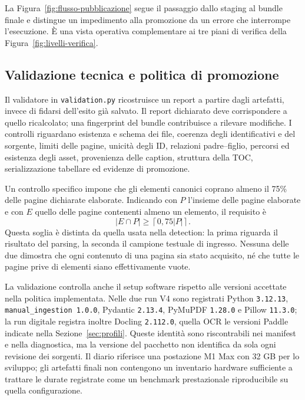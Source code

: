 La Figura~\ref{fig:flusso-pubblicazione} segue il passaggio dallo staging al bundle finale e distingue un impedimento alla promozione da un errore che interrompe l'esecuzione. È una vista operativa complementare ai tre piani di verifica della Figura~\ref{fig:livelli-verifica}.



\subsection{Validazione tecnica e politica di promozione}

Il validatore in \texttt{validation.py} ricostruisce un report a partire dagli artefatti, invece di fidarsi dell'esito già salvato. Il report dichiarato deve corrispondere a quello ricalcolato; una fingerprint del bundle contribuisce a rilevare modifiche. I controlli riguardano esistenza e schema dei file, coerenza degli identificativi e del sorgente, limiti delle pagine, unicità degli ID, relazioni padre--figlio, percorsi ed esistenza degli asset, provenienza delle caption, struttura della TOC, serializzazione tabellare ed evidenze di promozione.

Un controllo specifico impone che gli elementi canonici coprano almeno il 75\% delle pagine dichiarate elaborate. Indicando con $P$ l'insieme delle pagine elaborate e con $E$ quello delle pagine contenenti almeno un elemento, il requisito è
\begin{equation}
    |E\cap P|\geq\left\lceil0{,}75|P|\right\rceil.
\end{equation}
Questa soglia è distinta da quella usata nella detection: la prima riguarda il risultato del parsing, la seconda il campione testuale di ingresso. Nessuna delle due dimostra che ogni contenuto di una pagina sia stato acquisito, né che tutte le pagine prive di elementi siano effettivamente vuote.

La validazione controlla anche il setup software rispetto alle versioni accettate nella politica implementata. Nelle due run V4 sono registrati Python \texttt{3.12.13}, \texttt{manual\_ingestion 1.0.0}, Pydantic \texttt{2.13.4}, PyMuPDF \texttt{1.28.0} e Pillow \texttt{11.3.0}; la run digitale registra inoltre Docling \texttt{2.112.0}, quella OCR le versioni Paddle indicate nella Sezione~\ref{sec:profili}. Queste identità sono riscontrabili nei manifest e nella diagnostica, ma la versione del pacchetto non identifica da sola ogni revisione dei sorgenti. Il diario riferisce una postazione M1 Max con 32 GB per lo sviluppo; gli artefatti finali non contengono un inventario hardware sufficiente a trattare le durate registrate come un benchmark prestazionale riproducibile su quella configurazione.

